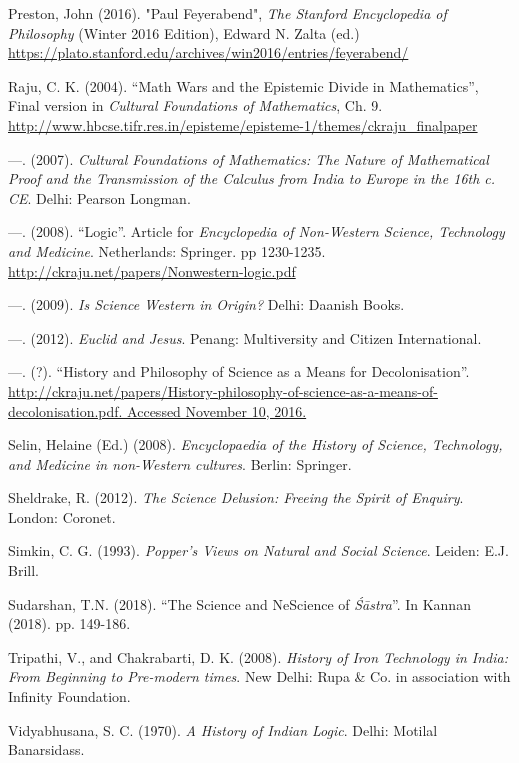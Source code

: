 \begin{thebibliography}{99}
  Preston, John (2016). "Paul Feyerabend", \textit{The Stanford Encyclopedia of Philosophy} (Winter 2016 Edition), Edward N. Zalta (ed.) \url{https://plato.stanford.edu/archives/win2016/entries/feyerabend/}
 
  Raju, C. K. (2004). “Math Wars and the Epistemic Divide in Mathematics”, Final version in \textit{Cultural Foundations of Mathematics}, Ch. 9. \url{http://www.hbcse.tifr.res.in/episteme/episteme-1/themes/ckraju_finalpaper}

  ---. (2007). \textit{Cultural Foundations of Mathematics: The Nature of Mathematical Proof and the Transmission of the Calculus from India to Europe in the 16th c. CE}. Delhi: Pearson Longman.

  ---. (2008). “Logic”. Article for \textit{Encyclopedia of Non-Western Science, Technology and Medicine}. Netherlands: Springer. pp 1230-1235. \url{http://ckraju.net/papers/Nonwestern-logic.pdf}

  ---. (2009). \textit{Is Science Western in Origin?} Delhi: Daanish Books.

  ---. (2012). \textit{Euclid and Jesus}. Penang: Multiversity and Citizen International.

  ---. (?). “History and Philosophy of Science as a Means for Decolonisation”. \url{http://ckraju.net/papers/History-philosophy-of-science-as-a-means-of-decolonisation.pdf. Accessed November 10, 2016.}

  Selin, Helaine (Ed.) (2008). \textit{Encyclopaedia of the History of Science, Technology, and Medicine in non-Western cultures}. Berlin: Springer.

  Sheldrake, R. (2012). \textit{The Science Delusion: Freeing the Spirit of Enquiry}. London: Coronet.

  Simkin, C. G. (1993). \textit{Popper's Views on Natural and Social Science}. Leiden: E.J. Brill.

  Sudarshan, T.N. (2018). “The Science and NeScience of \textit{Śāstra}”. In Kannan (2018). pp. 149-186.

  Tripathi, V., and Chakrabarti, D. K. (2008). \textit{History of Iron Technology in India: From Beginning to Pre-modern times}. New Delhi: Rupa \& Co. in association with Infinity Foundation.

  Vidyabhusana, S. C. (1970). \textit{A History of Indian Logic}. Delhi: Motilal Banarsidass.

 \end{thebibliography}

\theendnotes


